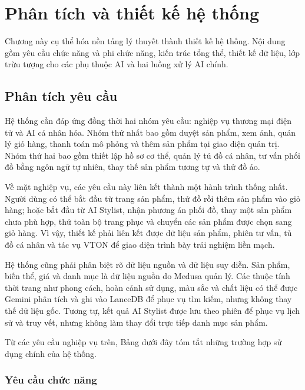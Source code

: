 \chapter{Phân tích và thiết kế hệ thống}

Chương này cụ thể hóa nền tảng lý thuyết thành thiết kế hệ thống. Nội dung gồm yêu cầu chức năng và phi chức năng, kiến trúc tổng thể, thiết kế dữ liệu, lớp trừu tượng cho các phụ thuộc AI và hai luồng xử lý AI chính.

\medskip

\section{Phân tích yêu cầu}

Hệ thống cần đáp ứng đồng thời hai nhóm yêu cầu: nghiệp vụ thương mại điện tử và AI cá nhân hóa. Nhóm thứ nhất bao gồm duyệt sản phẩm, xem ảnh, quản lý giỏ hàng, thanh toán mô phỏng và thêm sản phẩm tại giao diện quản trị. Nhóm thứ hai bao gồm thiết lập hồ sơ cơ thể, quản lý tủ đồ cá nhân, tư vấn phối đồ bằng ngôn ngữ tự nhiên, thay thế sản phẩm tương tự và thử đồ ảo.

\medskip

Về mặt nghiệp vụ, các yêu cầu này liên kết thành một hành trình thống nhất. Người dùng có thể bắt đầu từ trang sản phẩm, thử đồ rồi thêm sản phẩm vào giỏ hàng; hoặc bắt đầu từ AI Stylist, nhận phương án phối đồ, thay một sản phẩm chưa phù hợp, thử toàn bộ trang phục và chuyển các sản phẩm được chọn sang giỏ hàng. Vì vậy, thiết kế phải liên kết được dữ liệu sản phẩm, phiên tư vấn, tủ đồ cá nhân và tác vụ VTON để giao diện trình bày trải nghiệm liền mạch.

\medskip

Hệ thống cũng phải phân biệt rõ dữ liệu nguồn và dữ liệu suy diễn. Sản phẩm, biến thể, giá và danh mục là dữ liệu nguồn do Medusa quản lý. Các thuộc tính thời trang như phong cách, hoàn cảnh sử dụng, màu sắc và chất liệu có thể được Gemini phân tích và ghi vào LanceDB để phục vụ tìm kiếm, nhưng không thay thế dữ liệu gốc. Tương tự, kết quả AI Stylist được lưu theo phiên để phục vụ lịch sử và truy vết, nhưng không làm thay đổi trực tiếp danh mục sản phẩm.

\medskip

Từ các yêu cầu nghiệp vụ trên, Bảng dưới đây tóm tắt những trường hợp sử dụng chính của hệ thống.

\subsection{Yêu cầu chức năng}

